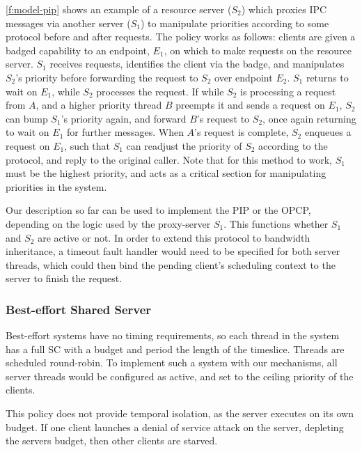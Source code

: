 \cref{f:model-pip} shows an example of a resource server ($S_{2}$) which proxies IPC messages via
another server ($S_{1}$) to manipulate priorities according to some protocol before and after
requests. The policy works as follows: clients are given a badged capability to an endpoint,
$E_{1}$, on which to make requests on the resource server. $S_{1}$ receives requests, identifies 
the client via the badge, and manipulates $S_{2}$'s priority before forwarding the request to
$S_{2}$ over endpoint $E_{2}$. $S_{1}$ returns to wait on $E_{1}$, while $S_{2}$ processes the
request. If while $S_{2}$ is processing a request from $A$, and a higher priority thread $B$
preempts it and sends a request on $E_{1}$, $S_{2}$ can bump $S_{1}$'s priority again, and forward
$B$'s request to $S_{2}$, once again returning to wait on $E_{1}$ for further messages. When $A$'s
request is complete, $S_{2}$ enqueues a request on $E_{1}$, such that $S_{1}$ can readjust the
priority of $S_{2}$ according to the protocol, and reply to the original caller. Note that for this
method to work, $S_{1}$ must be the highest priority, and acts as a critical section for
manipulating priorities in the system.

Our description so far can be used to implement the \gls{PIP} or the \gls{OPCP}, depending on 
the logic used by the proxy-server $S_{1}$. This functions whether $S_{1}$ and $S_{2}$ are active or
not. In order to extend this protocol to bandwidth inheritance, a timeout fault handler would need
to be specified for both server threads, which could then bind the pending client's scheduling
context to the server to finish the request. 

\subsubsection{Best-effort Shared Server}
\label{sec:best-effort}

Best-effort systems have no timing requirements, so each thread in the system has a full \gls{SC}
with a budget and period the length of the timeslice. Threads are scheduled round-robin. To
implement such a system with our mechanisms, all server threads would be configured as active, and 
set to the ceiling priority of the clients. 

This policy does not provide temporal isolation, as the server executes on its own budget.  If one
client launches a denial of service attack on the server, depleting the servers budget, then other
clients are starved. 

